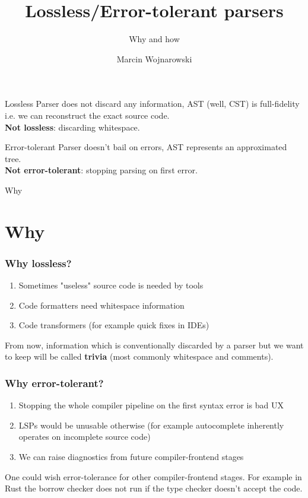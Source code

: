 \documentclass[compress,12pt,xcolor={dvipsnames}]{beamer}
\title{Lossless/Error-tolerant parsers}
\subtitle{Why and how}
\date{}
\author{Marcin Wojnarowski}
\institute{PL seminars}
\begin{document}


\begin{frame}
	\begin{block}{Lossless}
		Parser does not discard any information, AST (well, CST) is full-fidelity i.e. we can reconstruct the exact source code.\\\textbf{Not lossless}: discarding whitespace.
	\end{block}
	\begin{block}{Error-tolerant}
		Parser doesn't bail on errors, AST represents an approximated tree.\\\textbf{Not error-tolerant}: stopping parsing on first error.
	\end{block}
\end{frame}


\begin{frame}[standout]
	\centering\large
	Why
\end{frame}

\section{Why}
\begin{frame}
	\frametitle{Why lossless?}

	\begin{enumerate}
		\item Sometimes "useless" source code is needed by tools
		\item Code formatters need whitespace information
		\item Code transformers (for example quick fixes in IDEs)
	\end{enumerate}

	From now, information which is conventionally discarded by a parser but we want to keep will be called \textbf{trivia} (most commonly whitespace and comments).
\end{frame}

\begin{frame}
	\frametitle{Why error-tolerant?}

	\begin{enumerate}
		\item Stopping the whole compiler pipeline on the first syntax error is bad UX
		\item LSPs would be unusable otherwise (for example autocomplete inherently operates on incomplete source code)
		\item We can raise diagnostics from future compiler-frontend stages
	\end{enumerate}

	One could wish error-tolerance for other compiler-frontend stages. For example in Rust the borrow checker does not run if the type checker doesn't accept the code.
\end{frame}
\end{document}
